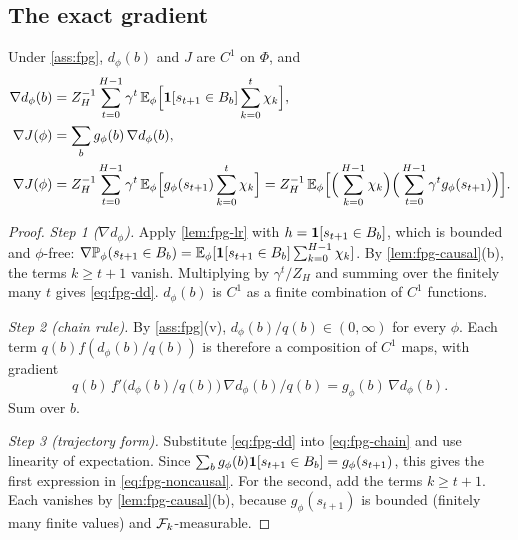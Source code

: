 \subsection{The exact gradient}

\begin{theorem}\label{thm:fpg-grad}
Under \cref{ass:fpg}, $d_\phi(b)$ and $J$ are $C^1$ on $\Phi$, and
\begin{align}
\nabla d_\phi(b)&=Z_H^{-1}\sum_{t=0}^{H-1}\gamma^t\,\mathbb{E}_\phi\Big[\mathbf{1}[s_{t+1}\in B_b]\sum_{k=0}^{t}\chi_k\Big],\label{eq:fpg-dd}\\
\nabla J(\phi)&=\sum_bg_\phi(b)\,\nabla d_\phi(b),\label{eq:fpg-chain}\\
\nabla J(\phi)&=Z_H^{-1}\sum_{t=0}^{H-1}\gamma^t\,\mathbb{E}_\phi\Big[g_\phi(s_{t+1})\sum_{k=0}^{t}\chi_k\Big]
           =Z_H^{-1}\,\mathbb{E}_\phi\Big[\Big(\sum_{k=0}^{H-1}\chi_k\Big)\Big(\sum_{t=0}^{H-1}\gamma^tg_\phi(s_{t+1})\Big)\Big].\label{eq:fpg-noncausal}
\end{align}
\end{theorem}
\begin{proof}
\emph{Step 1 ($\nabla d_\phi$).} Apply \cref{lem:fpg-lr} with $h=\mathbf{1}[s_{t+1}\in B_b]$, which is bounded and $\phi$-free:
$\nabla\mathbb{P}_\phi(s_{t+1}\in B_b)=\mathbb{E}_\phi[\mathbf{1}[s_{t+1}\in B_b]\sum_{k=0}^{H-1}\chi_k]$.
By \cref{lem:fpg-causal}(b), the terms $k\ge t+1$ vanish.
Multiplying by $\gamma^t/Z_H$ and summing over the finitely many $t$ gives \eqref{eq:fpg-dd}.
$d_\phi(b)$ is $C^1$ as a finite combination of $C^1$ functions.

\emph{Step 2 (chain rule).} By \cref{ass:fpg}(v), $d_\phi(b)/q(b)\in(0,\infty)$ for every $\phi$.
Each term $q(b)f(d_\phi(b)/q(b))$ is therefore a composition of $C^1$ maps, with gradient
\[
q(b)\,f'\big(d_\phi(b)/q(b)\big)\,\nabla d_\phi(b)/q(b)=g_\phi(b)\,\nabla d_\phi(b).
\]
Sum over $b$.

\emph{Step 3 (trajectory form).} Substitute \eqref{eq:fpg-dd} into \eqref{eq:fpg-chain} and use linearity of expectation.
Since $\sum_bg_\phi(b)\mathbf{1}[s_{t+1}\in B_b]=g_\phi(s_{t+1})$, this gives the first expression in \eqref{eq:fpg-noncausal}.
For the second, add the terms $k\ge t+1$.
Each vanishes by \cref{lem:fpg-causal}(b), because $g_\phi(s_{t+1})$ is bounded (finitely many finite values) and $\mathcal{F}_k$-measurable.
\end{proof}

